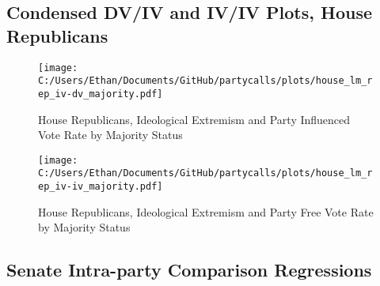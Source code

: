 \documentclass[12pt]{article}
\begin{document}
\clearpage

\subsection{Condensed DV/IV and IV/IV Plots, House Republicans}

\begin{figure}[h]
	\centering
	\caption{House Republicans, Ideological Extremism and Party Influenced Vote Rate by Majority Status}
	\texttt{[image: C:/Users/Ethan/Documents/GitHub/partycalls/plots/house\_lm\_rep\_iv-dv\_majority.pdf]}
\end{figure}


\begin{figure}[h]
	\centering
	\caption{House Republicans, Ideological Extremism and Party Free Vote Rate by Majority Status}
	\texttt{[image: C:/Users/Ethan/Documents/GitHub/partycalls/plots/house\_lm\_rep\_iv-iv\_majority.pdf]}
\end{figure}

\clearpage

\subsection{Senate Intra-party Comparison Regressions}
\end{document}
